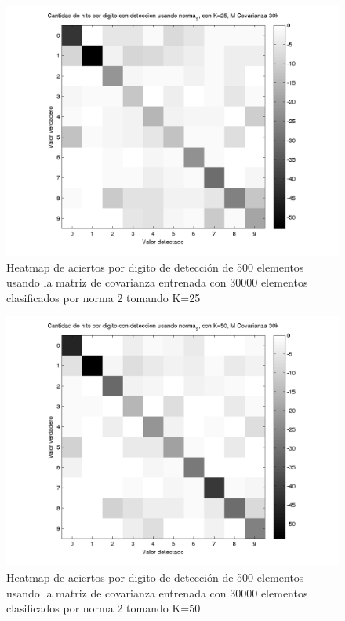 \begin{figure}[H]
\includegraphics[width=\hmwidth]{plots/heatmap-30kcv-k25-norma_2.png}
\caption{Heatmap de aciertos por digito de detecci\'on de 500 elementos usando la matriz de covarianza entrenada con 30000 elementos
clasificados por norma 2 tomando K=25 }
\label{fig:HM30kcv-k25}
\end{figure}

\begin{figure}[H]
\includegraphics[width=\hmwidth]{plots/heatmap-30kcv-k50-norma_2.png}
\caption{Heatmap de aciertos por digito de detecci\'on de 500 elementos usando la matriz de covarianza entrenada con 30000 elementos
clasificados por norma 2 tomando K=50 }
\label{fig:HM30kcv-k50}
\end{figure}